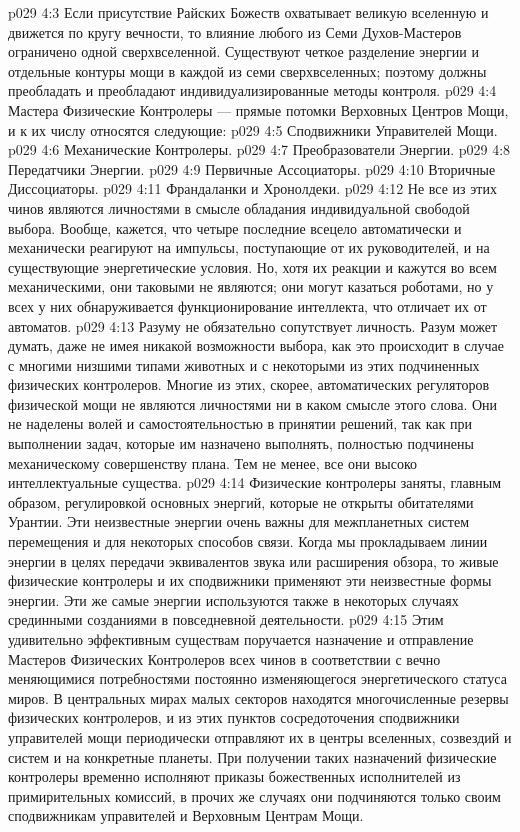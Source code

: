 \vs p029 4:3 Если присутствие Райских Божеств охватывает великую вселенную и движется по кругу вечности, то влияние любого из Семи Духов\hyp{}Мастеров ограничено одной сверхвселенной. Существуют четкое разделение энергии и отдельные контуры мощи в каждой из семи сверхвселенных; поэтому должны преобладать и преобладают индивидуализированные методы контроля.
\vs p029 4:4 \pc Мастера Физические Контролеры --- прямые потомки Верховных Центров Мощи, и к их числу относятся следующие:
\vs p029 4:5 \bibnobreakspace Сподвижники Управителей Мощи.
\vs p029 4:6 \bibnobreakspace Механические Контролеры.
\vs p029 4:7 \bibnobreakspace Преобразователи Энергии.
\vs p029 4:8 \bibnobreakspace Передатчики Энергии.
\vs p029 4:9 \bibnobreakspace Первичные Ассоциаторы.
\vs p029 4:10 \bibnobreakspace Вторичные Диссоциаторы.
\vs p029 4:11 \bibnobreakspace Франдаланки и Хронолдеки.
\vs p029 4:12 \pc Не все из этих чинов являются личностями в смысле обладания индивидуальной свободой выбора. Вообще, кажется, что четыре последние всецело автоматически и механически реагируют на импульсы, поступающие от их руководителей, и на существующие энергетические условия. Но, хотя их реакции и кажутся во всем механическими, они таковыми не являются; они могут казаться роботами, но у всех у них обнаруживается функционирование интеллекта, что отличает их от автоматов.
\vs p029 4:13 Разуму не обязательно сопутствует личность. Разум может думать, даже не имея никакой возможности выбора, как это происходит в случае с многими низшими типами животных и с некоторыми из этих подчиненных физических контролеров. Многие из этих, скорее, автоматических регуляторов физической мощи не являются личностями ни в каком смысле этого слова. Они не наделены волей и самостоятельностью в принятии решений, так как при выполнении задач, которые им назначено выполнять, полностью подчинены механическому совершенству плана. Тем не менее, все они высоко интеллектуальные существа.
\vs p029 4:14 Физические контролеры заняты, главным образом, регулировкой основных энергий, которые не открыты обитателями Урантии. Эти неизвестные энергии очень важны для межпланетных систем перемещения и для некоторых способов связи. Когда мы прокладываем линии энергии в целях передачи эквивалентов звука или расширения обзора, то живые физические контролеры и их сподвижники применяют эти неизвестные формы энергии. Эти же самые энергии используются также в некоторых случаях срединными созданиями в повседневной деятельности.
\vs p029 4:15 \pc {}\bibnobreakspace {} Этим удивительно эффективным существам поручается назначение и отправление Мастеров Физических Контролеров всех чинов в соответствии с вечно меняющимися потребностями постоянно изменяющегося энергетического статуса миров. В центральных мирах малых секторов находятся многочисленные резервы физических контролеров, и из этих пунктов сосредоточения сподвижники управителей мощи периодически отправляют их в центры вселенных, созвездий и систем и на конкретные планеты. При получении таких назначений физические контролеры временно исполняют приказы божественных исполнителей из примирительных комиссий, в прочих же случаях они подчиняются только своим сподвижникам управителей и Верховным Центрам Мощи.
